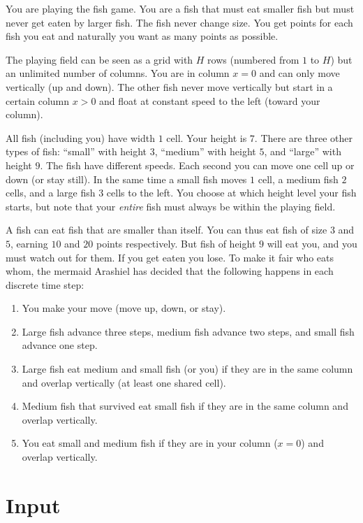 You are playing the fish game. You are a fish that must eat smaller fish but must never
get eaten by larger fish. The fish never change size. You get points for each fish you eat and naturally you want
as many points as possible.

The playing field can be seen as a grid with $H$ rows (numbered from $1$ to $H$) but an unlimited number of columns. You are
in column $x=0$ and can only move vertically (up and down). The other fish never move vertically
but start in a certain column $x>0$ and float at constant speed to the left (toward your column). 

All fish (including you) have width $1$ cell. Your height is $7$. There are three other types of fish: ``small'' with height $3$,
``medium'' with height $5$, and ``large'' with height $9$. The fish have different speeds. Each second you can move one cell
up or down (or stay still). In the same time a small fish moves $1$ cell, a medium fish $2$ cells, and a large
fish $3$ cells to the left. You choose at which height level your fish starts, but note that your \emph{entire} fish
must always be within the playing field.


A fish can eat fish that are smaller than itself. You can thus eat fish of size $3$ and $5$, earning $10$
and $20$ points respectively. But fish of height $9$ will eat you, and you must watch out for them. If you get
eaten you lose. To make it fair who eats whom, the mermaid Arashiel has decided that the following happens in each discrete
time step:
\begin{enumerate}
  \item You make your move (move up, down, or stay).
  \item Large fish advance three steps, medium fish advance two steps, and small fish advance one step.
  \item Large fish eat medium and small fish (or you) if they are in the same column and overlap vertically (at least one shared cell).
  \item Medium fish that survived eat small fish if they are in the same column and overlap vertically.
  \item You eat small and medium fish if they are in your column ($x=0$) and overlap vertically.
\end{enumerate}

\section*{Input}

